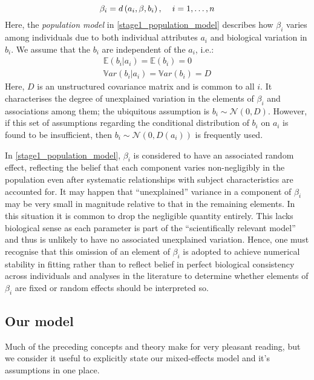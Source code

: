 \documentclass[11pt]{article} %
\begin{document}
\begin{equation} \label{stage1_population_model}
\beta_i = d\left(a_i,\beta,b_i\right), \hspace{4mm} i = 1,\ldots,n
\end{equation}
Here, the \emph{population model} in \eqref{stage1_population_model} describes how $\beta_i$ varies among individuals due to both individual attributes $a_i$ and biological variation in $b_i$. We assume that the $b_i$ are independent of the $a_i$, i.e.:
\begin{equation}
\begin{array}{l}
\mathbb{E}(b_i|a_i) = \mathbb{E}(b_i) = 0 \\
\mathbb{V}ar(b_i|a_i) = \mathbb{V}ar(b_i) = D
\end{array}
\end{equation}
Here, $D$ is an unstructured covariance matrix and is common to all $i$. It characterises the degree of unexplained variation in the elements of $\beta_i$ and associations among them; the ubiquitous assumption is $b_i \sim \mathcal{N}(0,D)$. However, if this set of assumptions regarding the conditional distribution of $b_i$ on $a_i$ is found to be insufficient, then $b_i \sim \mathcal{N}\left(0,D(a_i)\right)$ is frequently used.

In \eqref{stage1_population_model}, $\beta_i$ is considered to have an associated random effect, reflecting the belief that each component varies non-negligibly in the population even after systematic relationships with subject characteristics are accounted for. It may happen that ``unexplained'' variance in a component of $\beta_i$ may be very small in magnitude relative to that in the remaining elements. In this situation it is common to drop the negligible quantity entirely. This lacks biological sense as each parameter is part of the ``scientifically relevant model'' and thus is unlikely to have no associated unexplained variation. Hence, one must recognise that this omission of an element of $\beta_i$ is adopted to achieve numerical stability in fitting rather than to reflect belief in perfect biological consistency across individuals and analyses in the literature to determine whether elements of $\beta_i$ are fixed or random effects should be interpreted so.

\subsection{Our model}
Much of the preceding concepts and theory make for very pleasant reading, but we consider it useful to explicitly state our mixed-effects model and it's assumptions in one place.
\end{document}
